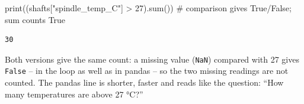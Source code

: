 \documentclass[
  letterpaper,
  DIV=11,
  numbers=noendperiod]{scrreprt}
\newenvironment{Shaded}{\begin{snugshade}}{\end{snugshade}}
\newcommand{\BuiltInTok}[1]{\textcolor[rgb]{0.00,0.23,0.31}{#1}}
\newcommand{\CommentTok}[1]{\textcolor[rgb]{0.37,0.37,0.37}{#1}}
\newcommand{\DecValTok}[1]{\textcolor[rgb]{0.68,0.00,0.00}{#1}}
\newcommand{\NormalTok}[1]{\textcolor[rgb]{0.00,0.23,0.31}{#1}}
\newcommand{\OperatorTok}[1]{\textcolor[rgb]{0.37,0.37,0.37}{#1}}
\newcommand{\StringTok}[1]{\textcolor[rgb]{0.13,0.47,0.30}{#1}}
\begin{document}
\begin{tcolorbox}[enhanced jigsaw, left=2mm, title=\textcolor{quarto-callout-caution-color}{\faFire}\hspace{0.5em}{Solution to Exercise 5}, opacityback=0, breakable, rightrule=.15mm, arc=.35mm, toptitle=1mm, colbacktitle=quarto-callout-caution-color!10!white, opacitybacktitle=0.6, coltitle=black, colframe=quarto-callout-caution-color-frame, bottomrule=.15mm, leftrule=.75mm, bottomtitle=1mm, titlerule=0mm, toprule=.15mm, colback=white]

\begin{Shaded}
\begin{Highlighting}[]
\BuiltInTok{print}\NormalTok{((shafts[}\StringTok{"spindle\_temp\_C"}\NormalTok{] }\OperatorTok{\textgreater{}} \DecValTok{27}\NormalTok{).}\BuiltInTok{sum}\NormalTok{())          }\CommentTok{\# comparison gives True/False; sum counts True}
\end{Highlighting}
\end{Shaded}

\begin{verbatim}
30
\end{verbatim}

Both versions give the same count: a missing value (\texttt{NaN})
compared with 27 gives \texttt{False} -- in the loop as well as in
pandas -- so the two missing readings are not counted. The pandas line
is shorter, faster and reads like the question: ``How many temperatures
are above 27 °C?''

\end{tcolorbox}
\end{document}
